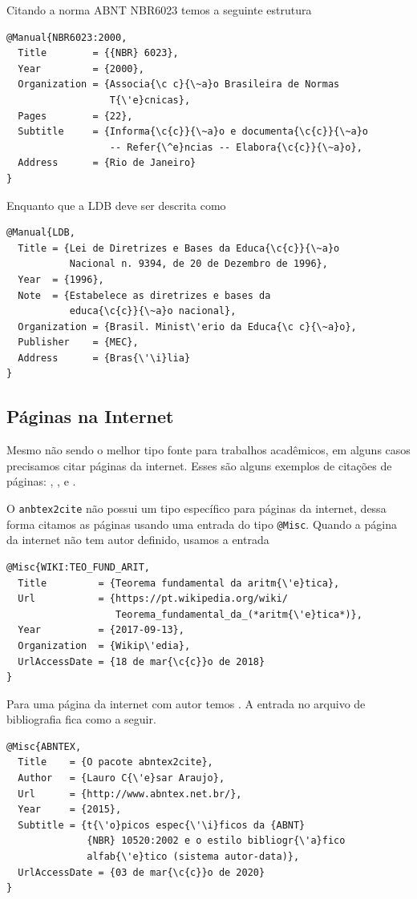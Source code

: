 \documentclass[fleqn]{icat-ufal}
\begin{document}
Citando a norma ABNT NBR6023 \cite{NBR6023:2000} temos a seguinte estrutura
\begin{lstlisting}
@Manual{NBR6023:2000,
  Title        = {{NBR} 6023},
  Year         = {2000},
  Organization = {Associa{\c c}{\~a}o Brasileira de Normas 
                  T{\'e}cnicas},
  Pages        = {22},
  Subtitle     = {Informa{\c{c}}{\~a}o e documenta{\c{c}}{\~a}o
                  -- Refer{\^e}ncias -- Elabora{\c{c}}{\~a}o},
  Address      = {Rio de Janeiro}
}
\end{lstlisting}

Enquanto que a LDB \cite{LDB} deve ser descrita como
\begin{lstlisting}
@Manual{LDB,
  Title = {Lei de Diretrizes e Bases da Educa{\c{c}}{\~a}o 
           Nacional n. 9394, de 20 de Dezembro de 1996},
  Year  = {1996},
  Note  = {Estabelece as diretrizes e bases da 
           educa{\c{c}}{\~a}o nacional},
  Organization = {Brasil. Minist\'erio da Educa{\c c}{\~a}o},
  Publisher    = {MEC},
  Address      = {Bras{\'\i}lia}
}
\end{lstlisting}

\subsection{Páginas na Internet}

Mesmo não sendo o melhor tipo fonte para trabalhos acadêmicos, 
em alguns casos precisamos citar páginas da internet. 
Esses são alguns exemplos de citações de páginas:
\citeauthor{WIKI:TEO_FUND_ARIT},
\citeauthor{TEXSTUDIO},
\citeauthor{GEOGEBRA} e
\citeauthor{JABREF}.

O \texttt{anbtex2cite} não possui um tipo específico para páginas da internet,
dessa forma citamos as páginas usando uma entrada do tipo \lstinline|@Misc|.
Quando a página da internet não tem autor definido, usamos a entrada 
\begin{lstlisting}
@Misc{WIKI:TEO_FUND_ARIT,
  Title         = {Teorema fundamental da aritm{\'e}tica},
  Url           = {https://pt.wikipedia.org/wiki/
                   Teorema_fundamental_da_(*aritm{\'e}tica*)},
  Year          = {2017-09-13},
  Organization  = {Wikip\'edia},
  UrlAccessDate = {18 de mar{\c{c}}o de 2018}
}
\end{lstlisting}

Para uma página da internet com autor temos \cite{ABNTEX,ARAUJO:ABNTEX2CITE}. 
A entrada no arquivo de bibliografia fica como a seguir.
\begin{lstlisting}
@Misc{ABNTEX,
  Title    = {O pacote abntex2cite},
  Author   = {Lauro C{\'e}sar Araujo},
  Url      = {http://www.abntex.net.br/},
  Year     = {2015},
  Subtitle = {t{\'o}picos espec{\'\i}ficos da {ABNT} 
              {NBR} 10520:2002 e o estilo bibliogr{\'a}fico
              alfab{\'e}tico (sistema autor-data)},
  UrlAccessDate = {03 de mar{\c{c}}o de 2020}
}
\end{lstlisting}
\end{document}
